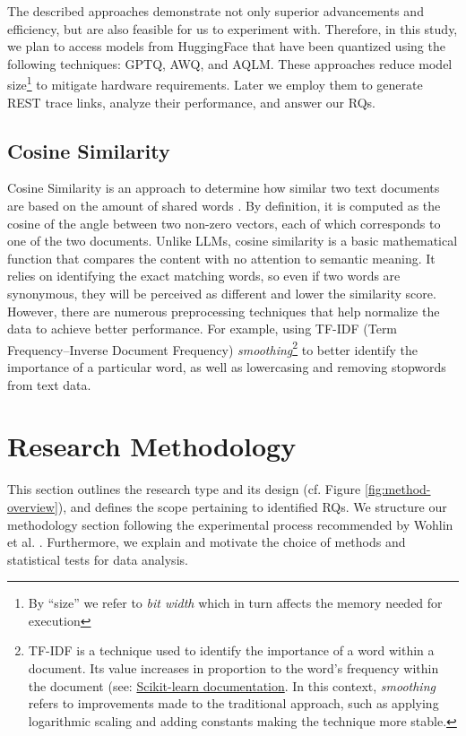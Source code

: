 \documentclass[conference]{IEEEtran}
\begin{document}
The described approaches demonstrate not only superior advancements and efficiency, but are also feasible for us to experiment with. Therefore, in this study, we plan to access models from HuggingFace that have been quantized using the following techniques: GPTQ, AWQ, and AQLM. These approaches reduce model size\footnote{By ``size'' we refer to \textit{bit width} which in turn affects the memory needed for execution} to mitigate hardware requirements. Later we employ them to generate REST trace links, analyze their performance, and answer our RQs. 

\subsection{Cosine Similarity}
Cosine Similarity is an approach to determine how similar two text documents are based on the amount of shared words \cite{lahitani2016cosine}. By definition, it is computed as the cosine of the angle between two non-zero vectors, each of which corresponds to one of the two documents\cite{desku2021cosine}. Unlike LLMs, cosine similarity is a basic mathematical function that compares the content with no attention to semantic meaning. It relies on identifying the exact matching words, so even if two words are synonymous, they will be perceived as different and lower the similarity score. However, there are numerous preprocessing techniques that help normalize the data to achieve better performance. For example, using TF-IDF (Term Frequency–Inverse Document Frequency) \textit{smoothing}\footnote{TF-IDF is a technique used to identify the importance of a word within a document. Its value increases in proportion to the word’s frequency within the document (see: \href{https://tinyurl.com/mrfebkkt}{Scikit-learn documentation}. In this context, \textit{smoothing} refers to improvements made to the traditional approach, such as applying logarithmic scaling and adding constants making the technique more stable.} to better identify the importance of a particular word, as well as lowercasing and removing stopwords from text data.


\section{Research Methodology}\label{sec:method}

This section outlines the research type and its design (cf. Figure \ref{fig:method-overview}), and defines the scope pertaining to identified RQs. We structure our methodology section following the experimental process recommended by Wohlin et al. \cite{wohlin2012experimentation}. Furthermore, we explain and motivate the choice of methods and statistical tests for data analysis. 
\end{document}
